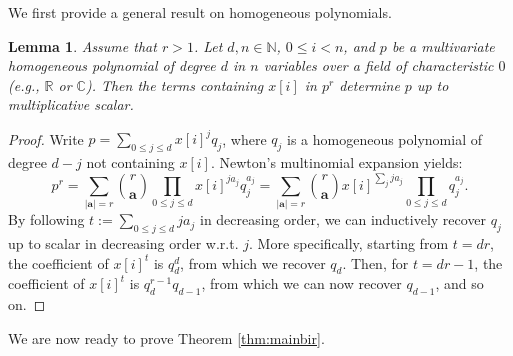 \documentclass[twoside]{article}
\theoremstyle{plain}%
\newtheorem{lem}[thm]{Lemma}
\theoremstyle{definition}
\theoremstyle{remark}
\begin{document}
We first provide a general result on homogeneous polynomials.
\begin{lem}\label{lemm:eulerproj}
Assume that $r > 1$. Let $d,n \in \mathbb{N}$, $0 \leq i < n$, and $p$ be a multivariate homogeneous polynomial of degree $d$ in $n$ variables over a field of characteristic $0$ (e.g., $\mathbb{R}$ or $\mathbb{C}$). Then the terms containing $x[i]$ in $p^r$ determine $p$ up to multiplicative scalar. 
\end{lem}
\begin{proof}
Write $p = \sum_{0 \leq j \leq d}x[i]^jq_j$, where $q_j$ is a homogeneous polynomial of degree $d-j$ not containing $x[i]$. Newton's multinomial expansion yields:
\begin{equation}
p^r = \sum_{|\mathbf{a}| = r}\binom{r}{\mathbf{a}} \prod_{0 \leq j \leq d} x[i]^{j a_j}q_j^{a_j} =  \sum_{|\mathbf{a}| = r}\binom{r}{\mathbf{a}} x[i]^{\sum_{j}j a_j} \prod_{0 \leq j \leq d} q_j^{a_j} .  
\end{equation}
By following $t := \sum_{0 \leq j \leq d}ja_j$ in decreasing order, we can inductively recover $q_j$ up to scalar in decreasing order w.r.t. $j$. More specifically, starting from $t = dr$, the coefficient of $x[i]^t$ is $q_d^{d}$, from which we recover $q_d$. Then, for $t = dr -1$, the coefficient of $x[i]^t$ is $q_d^{r-1}q_{d-1}$, from which we can now recover $q_{d-1}$, and so on.
\end{proof}
We are now ready to prove Theorem \ref{thm:mainbir}.
\end{document}
